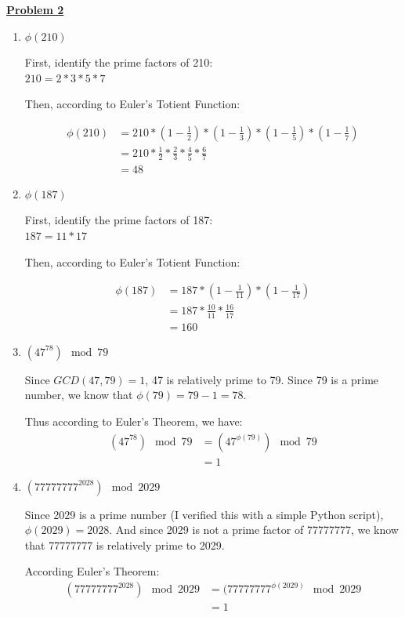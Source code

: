 \documentclass[11pt]{article}
\begin{document}
\underline{\textbf{Problem 2}}
\begin{enumerate}

\item $\phi(210)$

  First, identify the prime factors of 210:\\
  $210 = 2 * 3 * 5 * 7$

  Then, according to Euler's Totient Function:
  
  \begin{align}
    \phi(210) &= 210 * (1-\frac{1}{2}) * (1-\frac{1}{3}) *
    (1-\frac{1}{5}) * (1-\frac{1}{7})\\
    &= 210 * \frac{1}{2} * \frac{2}{3} * \frac{4}{5} * \frac{6}{7}\\
    &= 48
  \end{align}

\item $\phi(187)$

  First, identify the prime factors of 187:\\
  $187 = 11 * 17$

  Then, according to Euler's Totient Function:
  
  \begin{align}
    \phi(187) &= 187 * (1-\frac{1}{11}) * (1-\frac{1}{17})\\
    &= 187 * \frac{10}{11} * \frac{16}{17}\\
    &= 160
  \end{align}

\item $(47^{78}) \mod 79$

  Since $GCD(47, 79) = 1$, 47 is relatively prime to 79. Since 79 is a
  prime number, we know that $\phi(79) = 79 - 1 = 78$.

  Thus according to Euler's Theorem, we have:
  \begin{align}
    (47^{78}) \mod 79 &= (47^{\phi(79)}) \mod 79\\
    &= 1
  \end{align}

\item $(77777777^{2028}) \mod 2029$

  Since 2029 is a prime number (I verified this with a simple Python
  script), $\phi(2029) = 2028$. And since 2029 is not a prime factor
  of 77777777, we know that 77777777 is relatively prime to 2029.

  According Euler's Theorem:
  \begin{align}
    (77777777^{2028}) \mod 2029 &= (77777777^{\phi(2029)} \mod 2029\\
    &= 1
  \end{align}


\end{enumerate}
\end{document}
